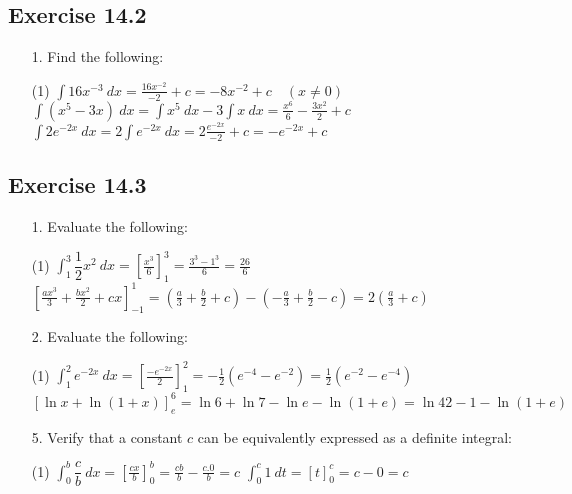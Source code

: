 \documentclass{./../../Latex/homework}
\begin{document}
\subsection*{Exercise 14.2}

\begin{enumerate}	
\item[1.] Find the following: 
\begin{tasks}(1)
\task[(a)] $\displaystyle\int 16 x^{-3}\ d x= \frac{16x^{-2}}{-2}+c=-8 x^{-2}+c \quad(x \neq 0)$
\task[(c)] $\displaystyle\int (x^5-3x) \ dx =\int x^5 \ dx-3 \int x \ dx=\frac{x^6}{6}-\frac{3x^2}{2} +c$
\task[(d)] $ \displaystyle\int 2e^{-2x} \ dx = 2 \displaystyle\int e^{-2x} \ dx = 2 \frac{e^{-2x}}{-2} + c= -e^{-2x} + c$
\end{tasks}
\end{enumerate}
\subsection*{Exercise 14.3}

\begin{enumerate}

\item[1.] Evaluate the following:
\begin{tasks}(1)
\task[(a)] $ \displaystyle\int_1^3 \dfrac{1}{2}x^2 \ dx = \left[\frac{x^3}{6} \right]_1^3=\frac{3^3-1^3}{6}=\frac{26}{6}$
\task[(e)] $\displaystyle \left[\frac{ax^3}{3}+\frac{bx^2}{2}+c x\right]_{-1}^1=\left(\frac{a}{3}+\frac{b}{2}+c\right)-\left(-\frac{a}{3}+\frac{b}{2}-c\right)=2\left(\frac{a}{3}+c\right)$ 
\end{tasks}

\item[2.] Evaluate the following:
\begin{tasks}(1)
\task[(a)] $ \displaystyle\int_1^2 e^{-2x} \ dx = \left[\frac{-e^{-2 x}}{2} \right]_1^2=-\frac{1}{2}\left(e^{-4}-e^{-2}\right)=\frac{1}{2}\left(e^{-2}-e^{-4}\right) $
\task[(d)] $ [\ln x+\ln (1+x)]_e^6= \ln 6+ \ln 7-\ln e - \ln (1+e) = \ln 42-1-\ln(1+e)$
\end{tasks}

\item[5.] Verify that a constant $c$ can be equivalently expressed as a definite integral:
\begin{tasks}(1)
\task $ \displaystyle \int_0^b \dfrac{c}{b}\ dx = \left[\frac{cx}{b}\right]_0^b = \frac{cb}{b}-\frac{c.0}{b} = c	$
\task $ \displaystyle  \int_0^c 1\ dt = [t]_0^c = c-0 = c 	$
\end{tasks}

\end{enumerate}
\end{document}
